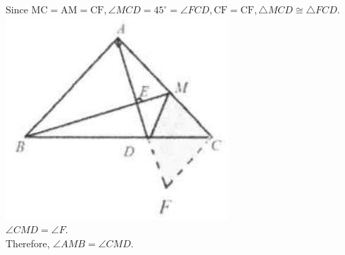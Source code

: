 \documentclass{article}
\begin{document}
Since \(\mathrm{MC}=\mathrm{AM}=\mathrm{CF}, \angle M C D=45^{\circ}=\angle F C D, \mathrm{CF}=\mathrm{CF}, \triangle M C D \cong \triangle F C D\).\\
\centering
\includegraphics[width=\textwidth]{images/140(2).jpg}\\
\(\angle C M D=\angle F\).\\
Therefore, \(\angle A M B=\angle C M D\).
\end{document}

